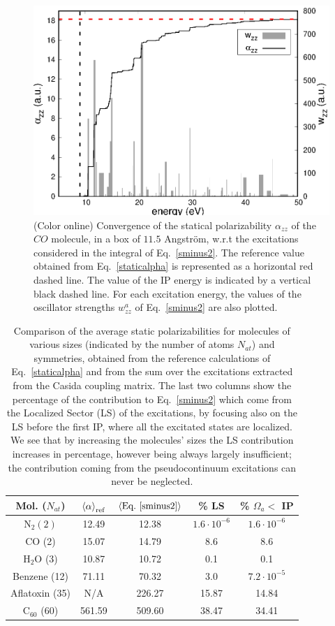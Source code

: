 \documentclass[reprint,aps,prb]{revtex4-1}
\renewcommand{\AA}{{Angstr\"om}}
\begin{document}
\begin{figure}
\includegraphics[scale=0.6]{Fig6_CO_statPolvsExc.eps}
\caption{\label{co_AlphaExc}(Color online) Convergence of the statical polarizability $\alpha_{zz}$ of the $CO$ molecule, in a box of $11.5$ \AA,
w.r.t the excitations considered in the integral of Eq.~\eqref{sminus2}. The reference value obtained from Eq.~\eqref{staticalpha} is represented as a
horizontal red dashed line. The value of the IP energy is indicated by a vertical black dashed line. For each excitation energy, the values of the
oscillator strengths $w^a_{zz}$ of Eq.~\eqref{sminus2} are also plotted. }
\end{figure}

\begin{table}
\begin{tabular}{c|cc||cc}
  Mol. ($N_{at}$) & $\braket{\alpha}_\text{ref}$ & $ \braket{\text{Eq.~\eqref{sminus2}}}$ & \% LS & \% $\Omega_a <$ IP  \\
  \hline
  \hline
  N$_2 (2)$ &12.49 & 12.38 & $1.6\cdot 10^{-6}$ & $1.6\cdot 10^{-6}$ \\
  CO (2)& 15.07 & 14.79 & 8.6 & 8.6 \\
  H$_2$O (3) & 10.87 & 10.72 & 0.1 & 0.1 \\
  Benzene (12)& 71.11 & 70.32 & 3.0 & $7.2 \cdot 10^{-5}$\\
  Aflatoxin (35)& N/A   & 226.27 & 15.87 & 14.84 \\
  C$_{60}$ (60)& 561.59 & 509.60 & 38.47 & 34.41
\end{tabular}\caption{Comparison of the average static polarizabilities for molecules of various sizes (indicated by the number of atoms $N_{at}$) and symmetries, obtained from the reference calculations of Eq.~\eqref{staticalpha} and from the sum over the excitations extracted from the Casida coupling matrix. The last two columns show the percentage of the contribution to Eq.~\eqref{sminus2} which
come from the Localized Sector (LS) of the excitations, by focusing also on the LS before the first IP, where all the excitated states are localized. We see that by increasing the molecules' sizes the LS contribution increases in percentage, however being always largely insufficient; the contribution coming from the pseudocontinuum excitations can never be neglected.}
\end{table}
\end{document}
